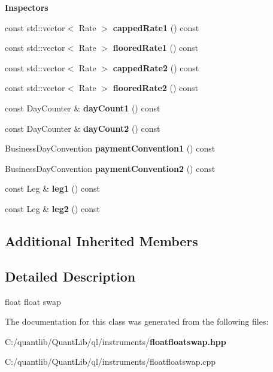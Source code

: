 \begin{Indent}{\bf Inspectors}
\begin{DoxyCompactItemize}
\item 
const std\+::vector$<$ Rate $>$ {\bfseries capped\+Rate1} () const \label{class_quant_lib_1_1_float_float_swap_ac85e8e28f8c3b4edad0c20696dab9f6e}

\item 
const std\+::vector$<$ Rate $>$ {\bfseries floored\+Rate1} () const \label{class_quant_lib_1_1_float_float_swap_a4f452efd37f94b4e81e39e5e7e43ac01}

\item 
const std\+::vector$<$ Rate $>$ {\bfseries capped\+Rate2} () const \label{class_quant_lib_1_1_float_float_swap_afbab1d9adc1db6a36690c8f06b06b5a4}

\item 
const std\+::vector$<$ Rate $>$ {\bfseries floored\+Rate2} () const \label{class_quant_lib_1_1_float_float_swap_a69c2b4725dedf010b89e4526401407ed}

\item 
const Day\+Counter \& {\bfseries day\+Count1} () const \label{class_quant_lib_1_1_float_float_swap_a2531a270f74a976d943d0718c2252379}

\item 
const Day\+Counter \& {\bfseries day\+Count2} () const \label{class_quant_lib_1_1_float_float_swap_ac9fd8bc631ded1c6236f4f5853729437}

\item 
Business\+Day\+Convention {\bfseries payment\+Convention1} () const \label{class_quant_lib_1_1_float_float_swap_a2a66d5658d7b845f94a4cae2252cf7b2}

\item 
Business\+Day\+Convention {\bfseries payment\+Convention2} () const \label{class_quant_lib_1_1_float_float_swap_a44bb5dd6279a724e3833bce247197330}

\item 
const Leg \& {\bfseries leg1} () const \label{class_quant_lib_1_1_float_float_swap_a036627bc2edb3c614281f9aa51bb4319}

\item 
const Leg \& {\bfseries leg2} () const \label{class_quant_lib_1_1_float_float_swap_a0228bf65184104aedde4f178f76fd5b2}

\end{DoxyCompactItemize}
\end{Indent}
\subsection*{Additional Inherited Members}


\subsection{Detailed Description}
float float swap 

The documentation for this class was generated from the following files\+:\begin{DoxyCompactItemize}
\item 
C\+:/quantlib/\+Quant\+Lib/ql/instruments/{\bf floatfloatswap.\+hpp}\item 
C\+:/quantlib/\+Quant\+Lib/ql/instruments/floatfloatswap.\+cpp\end{DoxyCompactItemize}
